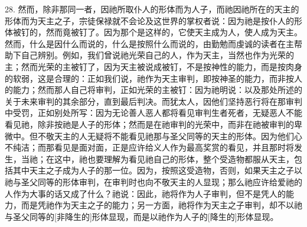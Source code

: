 28. 然而，除非那同一者，因祂所取仆人的形体而为人子，而祂因祂所在的天主的形体而为天主之子，宗徒保禄就不会论及这世界的掌权者说：因为祂是按仆人的形体被钉的，然而竟被钉了。因为那个是这样的，它使天主成为人，使人成为天主。然而，什么是因什么而说的，什么是按照什么而说的，由勤勉而虔诚的读者在主帮助下自己辨别。例如，我们曾说祂光荣自己的人，作为天主，当然也作为光荣的主；然而光荣的主被钉了，因为天主被说成被钉，不是按神性的能力，而是按肉身的软弱，这是合理的：正如我们说，祂作为天主审判，即按神圣的能力，而非按人的能力；然而那人自己将审判，正如光荣的主被钉：因为祂明说：以及那处所述的关于未来审判的其余部分，直到最后判决。而犹太人，因他们坚持恶行将在那审判中受罚，正如别处所写：因为无论善人恶人都将看见审判生者死者，无疑恶人不能看见祂，除非按祂是人子的形体；然而是在祂审判的光荣中，而非在祂被审判的卑微中。但不敬天主的人无疑将不能看见祂那与圣父同等的天主的形体。因为他们心不纯洁；而那看见是面对面，正是应许给义人作为最高奖赏的看见，并且那时将发生，当祂；在这中，祂也要理解为看见祂自己的形体，整个受造物都服从天主，包括其中天主之子成为人子的那一位。因为，按照这受造物，否则，如果天主之子以祂与圣父同等的形体审判，在审判时也向不敬天主的人显现；那么祂应许给爱祂的人作为大事的话又成了什么？祂说：因此，祂将作为人子审判，但不是凭人的能力，而是凭祂作为天主之子的能力；另一方面，祂将作为天主之子审判，却不以祂与圣父同等的[非降生的]形体显现，而是以祂作为人子的[降生的]形体显现。\par

